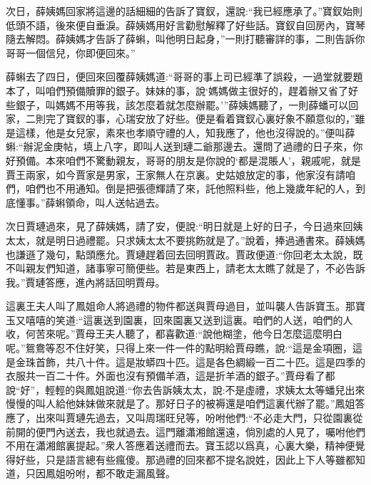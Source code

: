 \begin{parag}
    次日，薛姨媽回家將這邊的話細細的告訴了寶釵，還說:“我已經應承了。”寶釵始則低頭不語，後來便自垂淚。薛姨媽用好言勸慰解釋了好些話。寶釵自回房內，寶琴隨去解悶。薛姨媽才告訴了薛蝌，叫他明日起身，”一則打聽審詳的事，二則告訴你哥哥一個信兒，你即便回來。”
\end{parag}


\begin{parag}
    薛蝌去了四日，便回來回覆薛姨媽道:“哥哥的事上司已經準了誤殺，一過堂就要題本了，叫咱們預備贖罪的銀子。妹妹的事，說‘媽媽做主很好的，趕着辦又省了好些銀子，叫媽媽不用等我，該怎麼着就怎麼辦罷。’”薛姨媽聽了，一則薛蟠可以回家，二則完了寶釵的事，心瑞安放了好些。便是看着寶釵心裏好象不願意似的，”雖是這樣，他是女兒家，素來也孝順守禮的人，知我應了，他也沒得說的。”便叫薛蝌:“辦泥金庚帖，填上八字，即叫人送到璉二爺那邊去。還問了過禮的日子來，你好預備。本來咱們不驚動親友，哥哥的朋友是你說的‘都是混賬人’，親戚呢，就是賈王兩家，如今賈家是男家，王家無人在京裏。史姑娘放定的事，他家沒有請咱們，咱們也不用通知。倒是把張德輝請了來，託他照料些，他上幾歲年紀的人，到底懂事。”薛蝌領命，叫人送帖過去。
\end{parag}


\begin{parag}
    次日賈璉過來，見了薛姨媽，請了安，便說:“明日就是上好的日子，今日過來回姨太太，就是明日過禮罷。只求姨太太不要挑飭就是了。”說着，捧過通書來。薛姨媽也謙遜了幾句，點頭應允。賈璉趕着回去回明賈政。賈政便道:“你回老太太說，既不叫親友們知道，諸事寧可簡便些。若是東西上，請老太太瞧了就是了，不必告訴我。”賈璉答應，進內將話回明賈母。
\end{parag}


\begin{parag}
    這裏王夫人叫了鳳姐命人將過禮的物件都送與賈母過目，並叫襲人告訴寶玉。那寶玉又嘻嘻的笑道:“這裏送到園裏，回來園裏又送到這裏。咱們的人送，咱們的人收，何苦來呢。”賈母王夫人聽了，都喜歡道:“說他糊塗，他今日怎麼這麼明白呢。”鴛鴦等忍不住好笑，只得上來一件一件的點明給賈母瞧，說:“這是金項圈，這是金珠首飾，共八十件。這是妝蟒四十匹。這是各色綢緞一百二十匹。這是四季的衣服共一百二十件。外面也沒有預備羊酒，這是折羊酒的銀子。”賈母看了都說“好”，輕輕的與鳳姐說道:“你去告訴姨太太，說:不是虛禮，求姨太太等蟠兒出來慢慢的叫人給他妹妹做來就是了。那好日子的被褥還是咱們這裏代辦了罷。”鳳姐答應了，出來叫賈璉先過去，又叫周瑞旺兒等，吩咐他們:“不必走大門，只從園裏從前開的便門內送去，我也就過去。這門離瀟湘館還遠，倘別處的人見了，囑咐他們不用在瀟湘館裏提起。”衆人答應着送禮而去。寶玉認以爲真，心裏大樂，精神便覺得好些，只是語言總有些瘋傻。那過禮的回來都不提名說姓，因此上下人等雖都知道，只因鳳姐吩咐，都不敢走漏風聲。
\end{parag}


